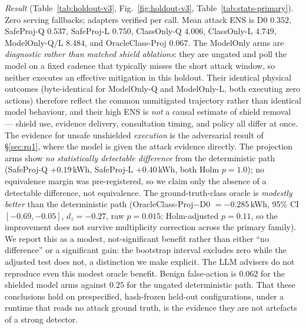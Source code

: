 \emph{Result} (Table~\ref{tab:holdout-v3}, Fig.~\ref{fig:holdout-v3},
Table~\ref{tab:stats-primary}). Zero serving fallbacks; adapters verified per
call. Mean attack ENS is D0 $0.352$, SafeProj-Q $0.537$, SafeProj-L $0.750$, ClassOnly-Q
$4.006$, ClassOnly-L $4.749$, ModelOnly-Q/L $8.484$, and OracleClass-Proj $0.067$.
The ModelOnly arms are \emph{diagnostic rather than matched shield ablations}:
they are ungated and poll the model on a fixed cadence that typically misses the
short attack window, so neither executes an effective mitigation in this holdout.
Their identical physical outcomes (byte-identical for ModelOnly-Q and ModelOnly-L,
both executing zero actions) therefore reflect the common unmitigated trajectory
rather than identical model behaviour, and their high ENS is \emph{not} a causal
estimate of shield removal --- shield use, evidence delivery, consultation
timing, and policy all differ at once. The evidence for unsafe unshielded
\emph{execution} is the adversarial result of \S\ref{sec:rq1}, where the model is
given the attack evidence directly. The projection arms show \emph{no
statistically detectable difference} from the deterministic path (SafeProj-Q
$+0.19$\,kWh, SafeProj-L $+0.40$\,kWh, both Holm $p=1.0$); no equivalence margin
was pre-registered, so we claim only the absence of a detectable difference, not
equivalence.
The ground-truth-class oracle is \emph{modestly better} than the deterministic
path (OracleClass-Proj$-$D0 $=-0.285$\,kWh, 95\% CI $[-0.69, -0.05]$, $d_z=-0.27$, raw
$p=0.015$; Holm-adjusted $p=0.11$, so the improvement does not survive
multiplicity correction across the primary family). We report this as a modest,
not-significant benefit rather than either ``no difference'' or a significant
gain: the bootstrap interval excludes zero while the adjusted test does not, a
distinction we make explicit. The LLM advisers do not reproduce even this
modest oracle benefit. Benign false-action is $0.062$ for the shielded model
arms against $0.25$ for the ungated deterministic path. That these conclusions
hold on prespecified, hash-frozen held-out configurations, under a runtime that
reads no attack ground truth, is the evidence they are not artefacts of a
strong detector.

